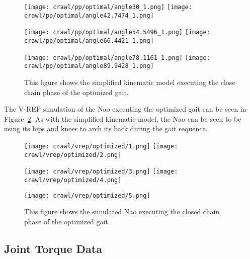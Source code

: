\begin{figure}
\centering
\texttt{[image: crawl/pp/optimal/angle30\_1.png]}
\texttt{[image: crawl/pp/optimal/angle42.7474\_1.png]}

\centering
\texttt{[image: crawl/pp/optimal/angle54.5496\_1.png]}
\texttt{[image: crawl/pp/optimal/angle66.4421\_1.png]}

\centering
\texttt{[image: crawl/pp/optimal/angle78.1161\_1.png]}
\texttt{[image: crawl/pp/optimal/angle89.9428\_1.png]}

\caption{This figure shows the simplified kinematic model executing the close
         chain phase of the optimized gait.}
\label{fig:pp_opt_gait1}
\end{figure}

The V-REP simulation of the Nao executing the optimized gait can be seen in
Figure~\ref{fig:vrep_nao_opt_gait1}. As with the
simplified kinematic model, the Nao can be seen to be using its hips and knees to arch its back during the gait sequence.

\begin{figure}
\centering
\texttt{[image: crawl/vrep/optimized/1.png]}
\texttt{[image: crawl/vrep/optimized/2.png]}

\centering
\texttt{[image: crawl/vrep/optimized/3.png]}
\texttt{[image: crawl/vrep/optimized/4.png]}

\centering
\texttt{[image: crawl/vrep/optimized/5.png]}

\caption{This figure shows the simulated Nao executing the closed chain phase of the
         optimized gait.}
\label{fig:vrep_nao_opt_gait1}
\end{figure}

\subsection{Joint Torque Data} \label{subsec:opt_joint_torque_data}

